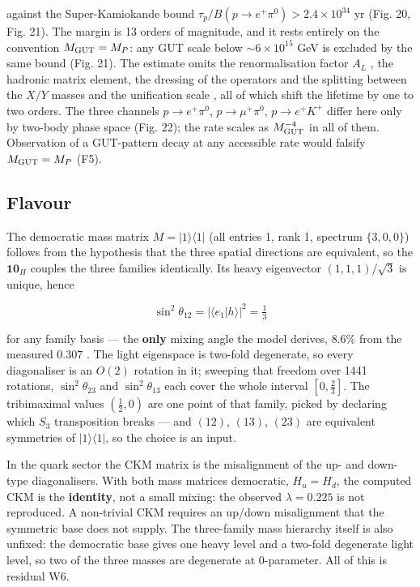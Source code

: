 \documentclass[aps,prd,amsmath,amssymb,superscriptaddress,longbibliography,floatfix,preprint]{revtex4-2}
\begin{document}
against the Super-Kamiokande bound $\tau_p/B(p\to e^+\pi^0) > 2.4\times10^{34}$ yr \cite{ref15} (Fig. 20, Fig. 21). The margin is 13 orders of magnitude, and it rests entirely on the convention $M_{\rm GUT} = M_P$: any GUT scale below $\sim 6\times10^{15}$ GeV is excluded by the same bound (Fig. 21). The estimate omits the renormalisation factor $A_L$ \cite{ref46}, the hadronic matrix element, the dressing of the operators and the splitting between the $X/Y$ masses and the unification scale \cite{ref51}, all of which shift the lifetime by one to two orders. The three channels $p\to e^+\pi^0$, $p\to\mu^+\pi^0$, $p\to e^+K^+$ differ here only by two-body phase space (Fig. 22); the rate scales as $M_{\rm GUT}^{-4}$ in all of them. Observation of a GUT-pattern decay at any accessible rate would falsify $M_{\rm GUT} = M_P$ (F5).

\subsection{Flavour}

The democratic mass matrix $M = |1\rangle\langle 1|$ (all entries 1, rank 1, spectrum $\{3,\allowbreak{}0,\allowbreak{}0\}$) \cite{ref43} follows from the hypothesis that the three spatial directions are equivalent, so the $\mathbf{10}_H$ couples the three families identically. Its heavy eigenvector $(1,\allowbreak{}1,\allowbreak{}1)/\sqrt3$ is unique, hence

\[\sin^2\theta_{12} = |\langle e_1|h\rangle|^2 = \tfrac13\]

for any family basis --- the \textbf{only} mixing angle the model derives, $8.6\%$ from the measured $0.307$ \cite{ref17,ref50}. The light eigenspace is two-fold degenerate, so every diagonaliser is an $O(2)$ rotation in it; sweeping that freedom over 1441 rotations, $\sin^2\theta_{23}$ and $\sin^2\theta_{13}$ each cover the whole interval $[0,\allowbreak{}\tfrac23]$. The tribimaximal values $(\tfrac12,\allowbreak{} 0)$ \cite{ref27} are one point of that family, picked by declaring which $S_3$ transposition breaks --- and $(12)$, $(13)$, $(23)$ are equivalent symmetries of $|1\rangle\langle1|$, so the choice is an input.

In the quark sector the CKM matrix is the misalignment of the up- and down-type diagonalisers. With both mass matrices democratic, $H_u = H_d$, the computed CKM is the \textbf{identity}, not a small mixing: the observed $\lambda = 0.225$ \cite{ref13,ref44} is not reproduced. A non-trivial CKM requires an up/down misalignment that the symmetric base does not supply. The three-family mass hierarchy itself is also unfixed: the democratic base gives one heavy level and a two-fold degenerate light level, so two of the three masses are degenerate at 0-parameter. All of this is residual W6.
\end{document}
